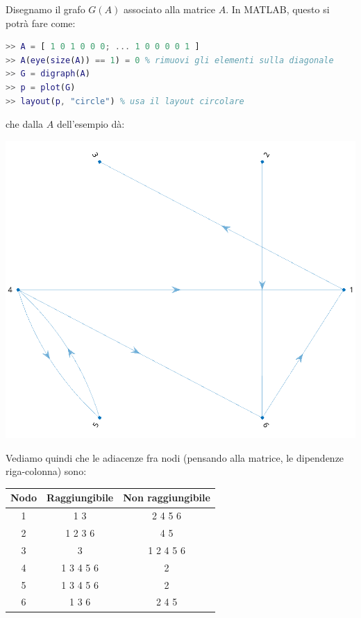 \documentclass[a4paper,11pt]{article}
\begin{document}
Disegnamo il grafo $G(A)$ associato alla matrice $A$.
In MATLAB, questo si potrà fare come:
\begin{lstlisting}[language=matlab, style=codestyle]	
>> A = [ 1 0 1 0 0 0; ... 1 0 0 0 0 1 ]
>> A(eye(size(A)) == 1) = 0 % rimuovi gli elementi sulla diagonale
>> G = digraph(A)
>> p = plot(G)
>> layout(p, "circle") % usa il layout circolare
\end{lstlisting}
che dalla $A$ dell'esempio dà:
\begin{center}
	\includegraphics[scale=0.9]{../figures/A1_graph.png}
\end{center}

Vediamo quindi che le adiacenze fra nodi (pensando alla matrice, le dipendenze riga-colonna) sono:
\begin{table}[h!]
	\center {}
	\begin{tabular} { c || c | c }
		\bfseries Nodo & \bfseries Raggiungibile & \bfseries Non raggiungibile \\
		\hline 
		1 & 1 3 & 2 4 5 6 \\
		2 & 1 2 3 6 & 4 5 \\
		3 & 3 & 1 2 4 5 6 \\
		4 & 1 3 4 5 6 & 2 \\
		5 & 1 3 4 5 6 & 2 \\
		6 & 1 3 6 & 2 4 5
	\end{tabular}
\end{table}
\end{document}
